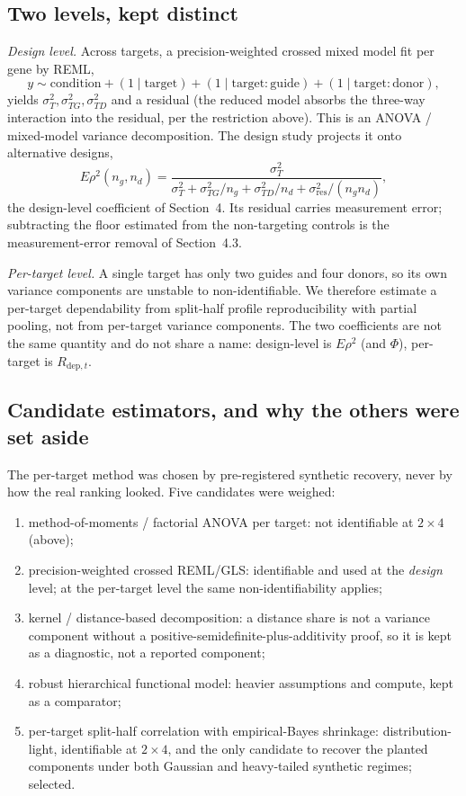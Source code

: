 \documentclass[11pt]{article}
\begin{document}
\subsection{Two levels, kept distinct}

\emph{Design level.} Across targets, a precision-weighted crossed mixed model fit
per gene by REML,
\[
y \sim \mathrm{condition} + (1\mid \mathrm{target})
      + (1\mid \mathrm{target{:}guide}) + (1\mid \mathrm{target{:}donor}),
\]
yields $\sigma^2_T,\sigma^2_{TG},\sigma^2_{TD}$ and a residual (the reduced model
absorbs the three-way interaction into the residual, per the restriction above).
This is an ANOVA / mixed-model variance decomposition. The design study projects it
onto alternative designs,
\[
E\rho^2(n_g,n_d) = \frac{\sigma^2_T}{\sigma^2_T + \sigma^2_{TG}/n_g
                  + \sigma^2_{TD}/n_d + \sigma^2_{\mathrm{res}}/(n_gn_d)},
\]
the design-level coefficient of Section~4. Its residual carries measurement error;
subtracting the floor estimated from the non-targeting controls is the
measurement-error removal of Section~4.3.

\emph{Per-target level.} A single target has only two guides and four donors, so its
own variance components are unstable to non-identifiable. We therefore estimate a
per-target dependability from split-half profile reproducibility with partial
pooling, not from per-target variance components. The two coefficients are not the
same quantity and do not share a name: design-level is $E\rho^2$ (and $\Phi$),
per-target is $R_{\mathrm{dep},t}$.

\subsection{Candidate estimators, and why the others were set aside}

The per-target method was chosen by pre-registered synthetic recovery, never by how
the real ranking looked. Five candidates were weighed:
\begin{enumerate}
  \item method-of-moments / factorial ANOVA per target: not identifiable at
  $2\times4$ (above);
  \item precision-weighted crossed REML/GLS: identifiable and used at the
  \emph{design} level; at the per-target level the same non-identifiability applies;
  \item kernel / distance-based decomposition: a distance share is not a variance
  component without a positive-semidefinite-plus-additivity proof, so it is kept as
  a diagnostic, not a reported component;
  \item robust hierarchical functional model: heavier assumptions and compute,
  kept as a comparator;
  \item per-target split-half correlation with empirical-Bayes shrinkage:
  distribution-light, identifiable at $2\times4$, and the only candidate to recover
  the planted components under both Gaussian and heavy-tailed synthetic regimes;
  selected.
\end{enumerate}
\end{document}
